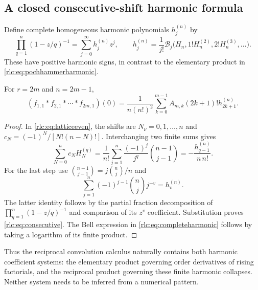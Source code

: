 \subsection{A closed consecutive-shift harmonic formula}
Define complete homogeneous harmonic polynomials $h_j^{(n)}$ by
\begin{equation}\label{rlc:eq:completeharmonic}
 \prod_{q=1}^n(1-z/q)^{-1}=\sum_{j=0}^\infty h_j^{(n)}z^j,
 \qquad
 h_j^{(n)}=\frac1{j!}\mathcal B_j
       \bigl(H_n,1!H_n^{(2)},2!H_n^{(3)},\ldots\bigr).
\end{equation}
These have positive harmonic signs, in contrast to the elementary
product in \eqref{rlc:eq:pochhammerharmonic}.

\begin{corollary}
\label{rlc:cor:consecutive}
For $r=2m$ and $n=2m-1$,
\begin{equation}\label{rlc:eq:consecutive}
 \boxed{\displaystyle
 (f_{1,1}*f_{2,1}*\cdots*f_{2m,1})(0)
   =\frac1{n(n!)^2}\sum_{k=0}^{m-1}
          A_{m,k}(2k+1)!h_{2k+1}^{(n)}.}
\end{equation}
\end{corollary}
\begin{proof}
In \eqref{rlc:eq:latticeeven}, the shifts are $N_\nu=0,1,\ldots,n$
and $c_N=(-1)^N/[N!(n-N)!]$.
Interchanging two finite sums gives
\[
 \sum_{N=0}^n c_NH_N^{(q)}
 =\frac1{n!}\sum_{j=1}^n\frac{(-1)^j}{j^q}\binom{n-1}{j-1}
 =-\frac{h_{q-1}^{(n)}}{n\,n!}.
\]
For the last step use
$\binom{n-1}{j-1}=j\binom nj/n$ and
\[
 \sum_{j=1}^n(-1)^{j-1}\binom nj j^{-v}=h_v^{(n)}.
\]
The latter identity follows by the partial fraction decomposition of
$\prod_{q=1}^n(1-z/q)^{-1}$ and comparison of its $z^v$ coefficient.
Substitution proves \eqref{rlc:eq:consecutive}. The Bell expression in
\eqref{rlc:eq:completeharmonic} follows by taking a logarithm of its
finite product.
\end{proof}

Thus the reciprocal convolution calculus naturally contains both
harmonic coefficient systems: the elementary product governing order
derivatives of rising factorials, and the reciprocal product governing
these finite harmonic collapses. Neither system needs to be inferred
from a numerical pattern.
